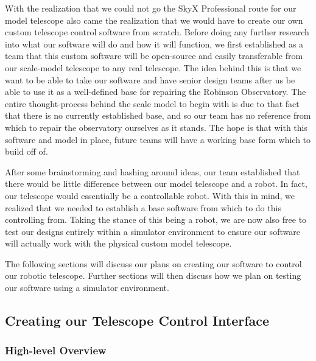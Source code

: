 \documentclass[12pt]{report}
\begin{document}
With the realization that we could not go the SkyX Professional route for our model telescope also came the realization that we would have to create our own custom telescope control software from scratch. Before doing any further research into what our software will do and how it will function, we first established as a team that this custom software will be open-source and easily transferable from our scale-model telescope to any real telescope. The idea behind this is that we want to be able to take our software and have senior design teams after us be able to use it as a well-defined base for repairing the Robinson Observatory. The entire thought-process behind the scale model to begin with is due to that fact that there is no currently established base, and so our team has no reference from which to repair the observatory ourselves as it stands. The hope is that with this software and model in place, future teams will have a working base form which to build off of.

After some brainstorming and hashing around ideas, our team established that there would be little difference between our model telescope and a robot. In fact, our telescope would essentially be a controllable robot. With this in mind, we realized that we needed to establish a base software from which to do this controlling from. Taking the stance of this being a robot, we are now also free to test our designs entirely within a simulator environment to ensure our software will actually work with the physical custom model telescope.

The following sections will discuss our plans on creating our software to control our robotic telescope. Further sections will then discuss how we plan on testing our software using a simulator environment.

\subsection*{Creating our Telescope Control Interface}

\subsubsection*{High-level Overview}
\end{document}
